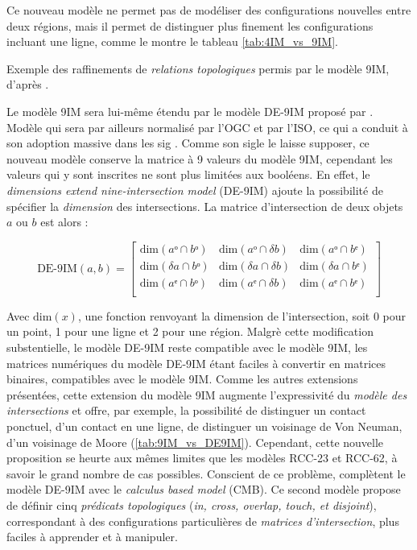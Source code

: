 Ce nouveau modèle ne permet pas de modéliser des configurations
nouvelles entre deux régions, mais il permet de distinguer plus
finement les configurations incluant une ligne, comme le montre le
tableau \ref{tab:4IM_vs_9IM}.

\begin{table}
  \centering
  
  \caption{Exemple des raffinements de \emph{relations topologiques}
    permis par le modèle 9IM, d'après \textcite{Egenhofer2011}.}
  \label{tab:4IM_vs_9IM}
\end{table}

Le modèle 9IM sera lui-même étendu par le modèle DE-9IM proposé par
\textcite{Clementini1993}. Modèle qui sera par ailleurs normalisé par
l'OGC et par l'ISO, ce qui a conduit à son adoption massive dans les
\ac{sig} \autocite{Strobl2008}. Comme son sigle le laisse supposer, ce
nouveau modèle conserve la matrice à 9 valeurs du modèle 9IM,
cependant les valeurs qui y sont inscrites ne sont plus limitées aux
booléens. En effet, le \emph{dimensions extend nine-intersection
  model} (DE-9IM) ajoute la possibilité de spécifier la
\emph{dimension} des intersections. La matrice d'intersection de deux
objets \(a\) ou \(b\) est alors :

\begin{equation}
  \label{eq:matrice_DE9IM}
  \text{DE-9IM}(a,b) =
  \begin{bmatrix}
    \text{dim}(aᵒ ∩ bᵒ)&\text{dim}(aᵒ ∩ δb)&\text{dim}(aᵒ ∩ bᵉ)\\
    \text{dim}(δa ∩ bᵒ)&\text{dim}(δa ∩ δb)&\text{dim}(δa ∩ bᵉ)\\
    \text{dim}(aᵉ ∩ bᵒ)&\text{dim}(aᵉ ∩ δb)&\text{dim}(aᵉ ∩ bᵉ)\\
  \end{bmatrix}
\end{equation}

Avec \(\text{dim}(x)\), une fonction renvoyant la dimension de
l'intersection, soit 0 pour un point, 1 pour une ligne et 2 pour une
région. Malgrè cette modification substentielle, le modèle DE-9IM
reste compatible avec le modèle 9IM, les matrices numériques du modèle
DE-9IM étant faciles à convertir en matrices binaires, compatibles
avec le modèle 9IM. Comme les autres extensions présentées, cette
extension du modèle 9IM augmente l'expressivité du \emph{modèle des
  intersections} et offre, par exemple, la possibilité de distinguer
un contact ponctuel, d'un contact en une ligne, \ie de distinguer un
voisinage de Von Neuman, d'un voisinage de Moore
(\autoref{tab:9IM_vs_DE9IM}). Cependant, cette nouvelle proposition se
heurte aux mêmes limites que les modèles RCC-23 et RCC-62, à savoir le
grand nombre de cas possibles. Conscient de ce problème,
\textcite{Clementini1993} complètent le modèle DE-9IM avec le
\emph{calculus based model} (CMB). Ce second modèle propose de définir
cinq \emph{prédicats topologiques} (\emph{in, cross, overlap, touch,
  et disjoint}), correspondant à des configurations particulières de
\emph{matrices d'intersection}, plus faciles à apprender et à
manipuler.

